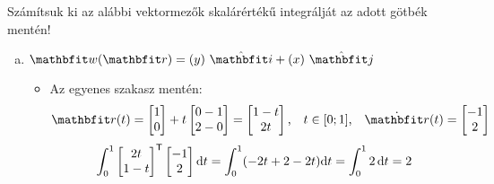 \documentclass[exercise]{math-standalone}
\begin{document}
\begin{exercise}{Számítsuk ki az alábbi vektormezők skalárértékű integrálját az adott götbék mentén!}
{\begin{enumerate}[a)]
      \item $\rvec w(\rvec r) = \ijz{y}{x}$
            \begin{itemize}[i)]
              \item Az egyenes szakasz mentén:
                    \[
                      \rvec r(t) = \begin{bmatrix}
                        1 \\ 0
                      \end{bmatrix} + t \begin{bmatrix}
                        0 - 1 \\ 2 - 0
                      \end{bmatrix} = \begin{bmatrix}
                        1 - t \\ 2t
                      \end{bmatrix}
                      \text, \quad
                      t \in [0;1]
                      \text, \quad
                      \dot{\rvec r}(t) = \begin{bmatrix}
                        -1 \\ 2
                      \end{bmatrix}
                    \]
                    \[
                      \int_0^1 \begin{bmatrix}
                        2t \\ 1 - t
                      \end{bmatrix}^{\mathsf{T}}
                      \begin{bmatrix}
                        -1 \\ 2
                      \end{bmatrix}
                      \mathrm{d} t
                      = \int_0^1 (-2t + 2 - 2t) \mathrm{d} t
                      = \int_0^1 2 \, \mathrm{d} t
                      = 2
                    \]


\end{itemize}
\end{enumerate}}
\end{exercise}
\end{document}
